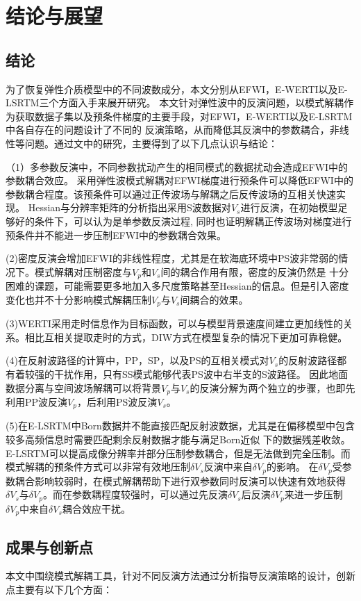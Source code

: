 \chapter{结论与展望}
\section{结论}
为了恢复弹性介质模型中的不同波数成分，本文分别从EFWI，E-WERTI以及E-LSRTM三个方面入手来展开研究。
本文针对弹性波中的反演问题，以模式解耦作为获取数据子集以及预条件梯度的主要手段，对EFWI，E-WERTI以及E-LSRTM中各自存在的问题设计了不同的
反演策略，从而降低其反演中的参数耦合，非线性等问题。通过文中的研究，主要得到了以下几点认识与结论：

（1）多参数反演中，不同参数扰动产生的相同模式的数据扰动会造成EFWI中的参数耦合效应。
采用弹性波模式解耦对EFWI梯度进行预条件可以降低EFWI中的参数耦合程度。该预条件可以通过正传波场与解耦之后反传波场的互相关快速实现。
Hessian与分辨率矩阵的分析指出采用S波数据对$V_s$进行反演，在初始模型足够好的条件下，可以认为是单参数反演过程,
同时也证明解耦正传波场对梯度进行预条件并不能进一步压制EFWI中的参数耦合效果。

(2)密度反演会增加EFWI的非线性程度，尤其是在软海底环境中PS波非常弱的情况下。模式解耦对压制密度与$V_p$和$V_s$间的耦合作用有限，密度的反演仍然是
十分困难的课题，可能需要更多地加入多尺度策略甚至Hessian的信息。但是引入密度变化也并不十分影响模式解耦压制$V_p$与$V_s$间耦合的效果。

(3)WERTI采用走时信息作为目标函数，可以与模型背景速度间建立更加线性的关系。相比互相关提取走时的方式，DIW方式在模型复杂的情况下更加可靠稳健。

(4)在反射波路径的计算中，PP，SP，以及PS的互相关模式对$V_s$的反射波路径都有着较强的干扰作用，只有SS模式能够代表PS波中右半支的S波路径。
因此地面数据分离与空间波场解耦可以将背景$V_p$与$V_s$的反演分解为两个独立的步骤，也即先利用PP波反演$V_p$，后利用PS波反演$V_s$。

(5)在E-LSRTM中Born数据并不能直接匹配反射波数据，尤其是在偏移模型中包含较多高频信息时需要匹配剩余反射数据才能与满足Born近似
下的数据残差收敛。E-LSRTM可以提高成像分辨率并部分压制参数耦合，但是无法做到完全压制。而模式解耦的预条件方式可以非常有效地压制$\delta
V_s$反演中来自$\delta V_p$的影响。
在$\delta V_p$受参数耦合影响较弱时，在模式解耦帮助下进行双参数同时反演可以快速有效地获得$\delta
V_s$与$\delta V_p$。而在参数耦程度较强时，可以通过先反演$\delta V_s$后反演$\delta
V_p$来进一步压制$\delta V_p$中来自$\delta V_s$耦合效应干扰。
\section{成果与创新点}
本文中围绕模式解耦工具，针对不同反演方法通过分析指导反演策略的设计，创新点主要有以下几个方面：

